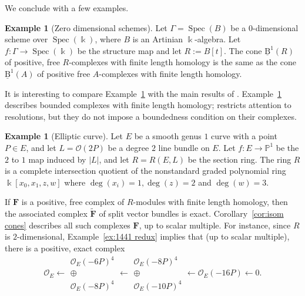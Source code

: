 \documentclass[12pt]{amsart}
\theoremstyle{definition}
\newtheorem{example}[lemma]{Example}
\theoremstyle{remark}
\newcommand{\Spec}{\operatorname{Spec}}
\newcommand{\kk}{\Bbbk}
\newcommand{\PP}{\mathbb{P}}
\newcommand{\cO}{\mathcal{O}}
\newcommand{\FF}{\mathbf{F}}
\newcommand{\BBQ}{\underline{\mathrm{B}}}
\begin{document}
We conclude with a few examples.

\begin{example}[Zero dimensional schemes]\label{ex:zero dim}Let $\Gamma=\Spec(B)$ be a $0$-dimensional scheme over $\Spec(\kk)$, where $B$ is an Artinian $\kk$-algebra.  Let $f\colon \Gamma\to \Spec(\kk)$ be the structure map and let $R:=B[t]$.  The cone $\BBQ^1(R)$ of positive, free $R$-complexes with finite length homology is the same as the cone $\BBQ^1(A)$ of positive free $A$-complexes with finite length homology.  
\end{example}

It is interesting to compare Example~\ref{ex:zero dim} with the main results of \cite{bbeg}.  Example~\ref{ex:zero dim} describes bounded complexes with finite length homology; \cite{bbeg} restricts attention to resolutions, but they do not impose a boundedness condition on their complexes.

\begin{example}[Elliptic curve]
Let $E$ be a smooth genus $1$ curve with a point $P\in E$, and let $L=\cO(2P)$ be a degree $2$ line bundle on $E$.  Let $f\colon E\to \PP^1$ be the $2$ to $1$ map induced by $|L|$, and let $R=R(E,L)$ be the section ring.  The ring $R$ is a complete intersection quotient of the nonstandard graded polynomial ring $\kk[x_0,x_1,z,w]$ where $\deg(x_i)=1, \deg(z)=2$ and $\deg(w)=3$.  

If $\FF$ is a positive, free complex of $R$-modules with finite length homology, then the associated complex $\widetilde{\FF}$ of split vector bundles is exact.  Corollary~\ref{cor:isom cones} describes all such complexes $\FF$, up to scalar multiple.
For instance, since $R$ is $2$-dimensional, Example~\ref{ex:1441 redux} implies that (up to scalar multiple), there is a positive, exact complex
\[
\cO_E\longleftarrow \begin{matrix}  \cO_E(-6P)^4\\ \oplus\\ \cO_E(-8P)^4\end{matrix}\longleftarrow \begin{matrix}  \cO_E(-8P)^4\\ \oplus\\ \cO_E(-10P)^4\end{matrix} \longleftarrow \cO_E(-16P)\longleftarrow 0.
\]
\end{example}
\end{document}
